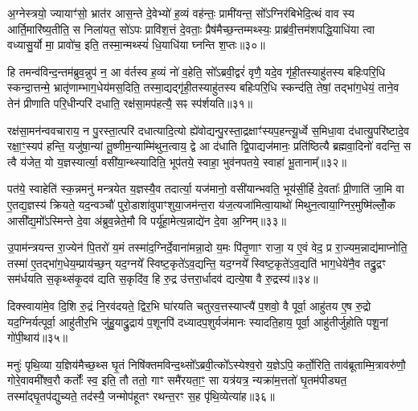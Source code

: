 {\anuvakamend[{आ॒साद्य॒ प्रान॑तिदृश्ञं करोति हरति वियु॒याद्यज॑मानमे॒वाग्निरिति॑ स॒प्तद॑श च॥५॥}]}

अ॒ग्नेस्त्रयो॒ ज्यायाꣳ॑सो॒ भ्रात॑र आस॒न्ते दे॒वेभ्यो॑ ह॒व्यं वह॑न्तः॒ प्रामी॑यन्त॒ सो᳚\-ऽग्निर॑बिभेदि॒त्थं वाव स्य आर्ति॒मारि॑ष्य॒तीति॒ स निला॑यत॒ सो॑\-ऽपः प्रावि॑श॒त्तं दे॒वताः॒ प्रैष॑मैच्छ॒न्तम्मथ्स्यः॒ प्राब्र॑वी॒त्तम॑शपद्धि॒याधि॑या त्वा वध्यासु॒र्यो मा॒ प्रावो॑च॒ इति॒ तस्मा॒न्मथ्स्यं॑ धि॒याधि॑या घ्नन्ति श॒प्तः॥३०॥

हि तमन्व॑विन्द॒न्तम॑ब्रुव॒न्नुप॑ न॒ आ व॑र्तस्व ह॒व्यं नो॑ व॒हेति॒ सो᳚\-ऽब्रवी॒द्वरं॑ वृणै॒ यदे॒व गृ॑ही॒तस्याहु॑तस्य बहिःपरि॒धि स्कन्दा॒त्तन्मे॒ भ्रातृ॑णाम्भाग॒धेय॑मस॒दिति॒ तस्मा॒द्यद्गृ॑ही॒तस्याहु॑तस्य बहिःपरि॒धि स्कन्द॑ति॒ तेषां॒ तद्भा॑ग॒धेयं॒ ताने॒व तेन॑ प्रीणाति परि॒धीन्परि॑ दधाति॒ रक्ष॑सा॒मप॑हत्यै॒ सꣴ स्प॑र्शयति॥३१॥

रक्ष॑सा॒मन॑न्ववचाराय॒ न पु॒रस्ता॒त्परि॑ दधात्यादि॒त्यो ह्ये॑वोद्यन्पु॒रस्ता॒द्रक्षाꣳ॑स्यप॒हन्त्यू॒र्ध्वे स॒मिधा॒वा द॑धात्यु॒परि॑ष्टादे॒व रक्षा॒ꣳ॒स्यप॑ हन्ति॒ यजु॑षा॒न्यां तू॒ष्णीम॒न्याम्मि॑थुन॒त्वाय॒ द्वे आ द॑धाति द्वि॒पाद्यज॑मानः॒ प्रति॑ष्ठित्यै ब्रह्मवा॒दिनो॑ वदन्ति॒ स त्वै य॑जेत॒ यो य॒ज्ञस्यार्त्या॒ वसी॑या॒न्थ्स्यादिति॒ भूप॑तये॒ स्वाहा॒ भुव॑नपतये॒ स्वाहा॑ भू॒तानाम्᳚॥३२॥

पत॑ये॒ स्वाहेति॑ स्क॒न्नमनु॑ मन्त्रयेत य॒ज्ञस्यै॒व तदार्त्या॒ यज॑मानो॒ वसी॑यान्भवति॒ भूय॑सी॒र्\mbox{}हि दे॒वताः᳚ प्री॒णाति॑ जा॒मि वा ए॒तद्य॒ज्ञस्य॑ क्रियते॒ यद॒न्वञ्चौ॑ पुरो॒डाशा॑वुपाꣳशुया॒जम॑न्त॒रा य॑ज॒त्यजा॑मित्वा॒याथो॑ मिथुन॒त्वाया॒ग्निर॒मुष्मि॑ल्लोँ॒क आसी᳚द्य॒मो᳚\-ऽस्मिन्ते दे॒वा अ॑ब्रुव॒न्नेते॒मौ वि पर्यू॑हा॒मेत्य॒न्नाद्ये॑न दे॒वा अ॒ग्निम्॥३३॥

उ॒पाम॑न्त्रयन्त रा॒ज्येन॑ पि॒तरो॑ य॒मं तस्मा॑द॒ग्निर्दे॒वाना॑मन्ना॒दो य॒मः पि॑तृ॒णाꣳ राजा॒ य ए॒वं वेद॒ प्र रा॒ज्यम॒न्नाद्य॑माप्नोति॒ तस्मा॑ ए॒तद्भा॑ग॒धेय॒म्प्राय॑च्छ॒न् यद॒ग्नये᳚ स्विष्ट॒कृते॑\-ऽव॒द्यन्ति॒ यद॒ग्नये᳚ स्विष्ट॒कृते॑\-ऽव॒द्यति॑ भाग॒धेये॑नै॒व तद्रु॒द्रꣳ सम॑र्धयति स॒कृथ्स॑कृ॒दव॑ द्यति स॒कृदि॑व॒ हि रु॒द्र उ॑त्तरा॒र्धादव॑ द्यत्ये॒षा वै रु॒द्रस्य॑॥३४॥

दिक्स्वाया॑मे॒व दि॒शि रु॒द्रं नि॒रव॑दयते॒ द्विर॒भि घा॑रयति चतुरव॒त्तस्याप्त्यै॑ प॒शवो॒ वै पूर्वा॒ आहु॑तय ए॒ष रु॒द्रो यद॒ग्निर्यत्पूर्वा॒ आहु॑तीर॒भि जु॑हु॒याद्रु॒द्राय॑ प॒शूनपि॑ दध्यादप॒शुर्यज॑मानः स्यादति॒हाय॒ पूर्वा॒ आहु॑तीर्जुहोति पशू॒नां गो॑पी॒थाय॑॥३५॥

{\anuvakamend[{श॒प्तः स्प॑र्शयति भू॒ताना॑म॒ग्निꣳ रु॒द्रस्य॑ स॒प्तत्रिꣳ॑शच्च॥६॥}]}

मनुः॑ पृथि॒व्या य॒ज्ञिय॑मैच्छ॒थ्स घृ॒तं निषि॑क्तमविन्द॒थ्सो᳚\-ऽब्रवी॒त्को᳚\-ऽस्येश्व॒रो य॒ज्ञे\-ऽपि॒ कर्तो॒रिति॒ ताव॑ब्रूताम्मि॒त्रावरु॑णौ॒ गोरे॒वावमी᳚श्व॒रौ कर्तोः᳚ स्व॒ इति॒ तौ ततो॒ गाꣳ समै॑रयता॒ꣳ॒ सा यत्र॑यत्र॒ न्यक्रा॑म॒त्ततो॑ घृ॒तम॑पीड्यत॒ तस्मा᳚द्घृ॒तप॑द्युच्यते॒ तद॑स्यै॒ जन्मोप॑हूतꣳ रथन्त॒रꣳ स॒ह पृ॑थि॒व्येत्या॑ह॥३६॥

